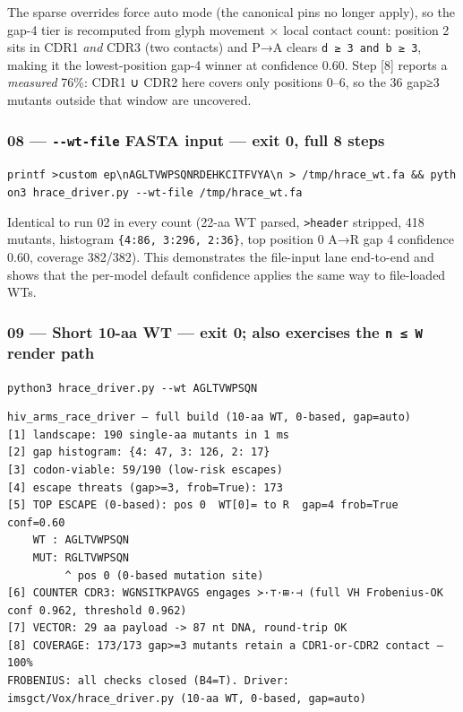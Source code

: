 \documentclass[12pt,a4paper]{article}
\begin{document}
The sparse overrides force auto mode (the canonical pins no longer
apply), so the gap-4 tier is recomputed from glyph movement × local
contact count: position 2 sits in CDR1 \emph{and} CDR3 (two contacts)
and P→A clears \texttt{d\ ≥\ 3\ and\ b\ ≥\ 3}, making it the
lowest-position gap-4 winner at confidence 0.60. Step {[}8{]} reports a
\emph{measured} 76\%: CDR1 ∪ CDR2 here covers only positions 0--6, so
the 36 gap≥3 mutants outside that window are uncovered.

\hypertarget{wt-file-fasta-input-exit-0-full-8-steps}{%
\subsubsection{\texorpdfstring{08 --- \texttt{-\/-wt-file} FASTA input
--- exit 0, full 8
steps}{08 --- -\/-wt-file FASTA input --- exit 0, full 8 steps}}\label{wt-file-fasta-input-exit-0-full-8-steps}}

\texttt{printf\ \textquotesingle{}\textgreater{}custom\ ep\textbackslash{}nAGLTVWPSQNRDEHKCITFVYA\textbackslash{}n\textquotesingle{}\ \textgreater{}\ /tmp/hrace\_wt.fa\ \&\&\ python3\ hrace\_driver.py\ -\/-wt-file\ /tmp/hrace\_wt.fa}

Identical to run 02 in every count (22-aa WT parsed,
\texttt{\textgreater{}header} stripped, 418 mutants, histogram
\texttt{\{4:86,\ 3:296,\ 2:36\}}, top position 0 A→R gap 4 confidence
0.60, coverage 382/382). This demonstrates the file-input lane
end-to-end and shows that the per-model default confidence applies the
same way to file-loaded WTs.

\hypertarget{short-10-aa-wt-exit-0-also-exercises-the-n-w-render-path}{%
\subsubsection{\texorpdfstring{09 --- Short 10-aa WT --- exit 0; also
exercises the \texttt{n\ ≤\ W} render
path}{09 --- Short 10-aa WT --- exit 0; also exercises the n ≤ W render path}}\label{short-10-aa-wt-exit-0-also-exercises-the-n-w-render-path}}

\texttt{python3\ hrace\_driver.py\ -\/-wt\ AGLTVWPSQN}

\begin{verbatim}
hiv_arms_race_driver — full build (10-aa WT, 0-based, gap=auto)
[1] landscape: 190 single-aa mutants in 1 ms
[2] gap histogram: {4: 47, 3: 126, 2: 17}
[3] codon-viable: 59/190 (low-risk escapes)
[4] escape threats (gap>=3, frob=True): 173
[5] TOP ESCAPE (0-based): pos 0  WT[0]= to R  gap=4 frob=True conf=0.60
    WT : AGLTVWPSQN
    MUT: RGLTVWPSQN
         ^ pos 0 (0-based mutation site)
[6] COUNTER CDR3: WGNSITKPAVGS engages ≻·⊤·⊞·⊣ (full VH Frobenius-OK conf 0.962, threshold 0.962)
[7] VECTOR: 29 aa payload -> 87 nt DNA, round-trip OK
[8] COVERAGE: 173/173 gap>=3 mutants retain a CDR1-or-CDR2 contact — 100%
FROBENIUS: all checks closed (B4=T). Driver: imsgct/Vox/hrace_driver.py (10-aa WT, 0-based, gap=auto)
\end{verbatim}
\end{document}
